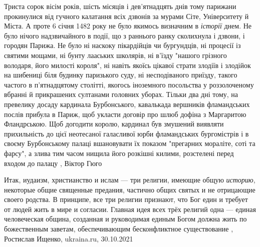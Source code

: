 Триста сорок вісім років, шість місяців і дев'ятнадцять днів тому парижани
прокинулися від гучного калатання всіх дзвонів за мурами Сіте,
Університету й Міста.  А проте 6 січня 1482 року не було якимось визначним в
\emph{історії} днем. Не було нічого надзвичайного в події, що з раннього ранку
сколихнула і дзвони, і городян Парижа. Не було ні наскоку пікардійців чи
бургундців, ні процесії із святими мощами, ні бунту лааських школярів, ні
в'їзду "нашого грізного володаря, його милості короля", ні навіть якоїсь
цікавої страти злодіїв і злодійок на шибениці біля будинку паризького суду, ні
несподіваного приїзду, такого частого в п'ятнадцятому столітті, якогось
іноземного посольства у роззолоченому вбранні й прикрашених султанами головних
уборах. Тільки два дні тому, на превелику досаду кардинала Бурбонського,
кавалькада вершників фламандських послів прибула в Париж, щоб укласти договір
про шлюб дофіна з Маргаритою Фландрською. Щоб догодити королю, кардинал був
змушений виявляти прихильність до цієї неотесаної галасливої юрби фламандських
бургомістрів і в своєму Бурбонському палаці вшановувати їх показом "прегарних
мораліте, соті та фарсу", а злива тим часом нищила його розкішні килими,
розстелені перед входом до палацу
, Віктор Гюго

Итак, иудаизм, христианство и ислам — три религии, имеющие общую \emph{историю},
некоторые общие священные предания, частично общих святых и не отрицающие
своего родства. В принципе, все три религии признают, что Бог един и требует от
людей жить в мире и согласии. Главная идея всех трёх религий одна — единая
человеческая община, созданная и руководимая единым Богом должна жить по
божественным заветам, обеспечивающим бесконфликтное существование
, 
Ростислав Ищенко, ukraina.ru, 30.10.2021


